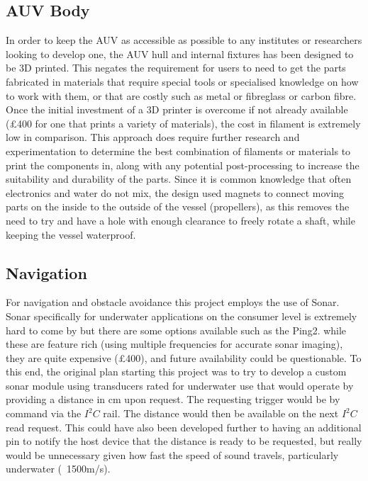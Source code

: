 \documentclass[11pt,a4paper,titlepage]{report}
\begin{document}
	\subsection*{AUV Body}
	In order to keep the AUV as accessible as possible to any institutes or researchers looking to develop one, the AUV hull and internal fixtures has been designed to be 3D printed. This negates the requirement for users to need to get the parts fabricated in materials that require special tools or specialised knowledge on how to work with them, or that are costly such as metal or fibreglass or carbon fibre. Once the initial investment of a 3D printer is overcome if not already available (\unit{\approx}£400 for one that prints a variety of materials), the cost in filament is extremely low in comparison. This approach does require further research and experimentation to determine the best combination of filaments or materials to print the components in, along with any potential post-processing to increase the suitability and durability of the parts.
	Since it is common knowledge that often electronics and water do not mix, the design used magnets to connect moving parts on the inside to the outside of the vessel (propellers), as this removes the need to try and have a hole with enough clearance to freely rotate a shaft, while keeping the vessel waterproof. 
	
	\subsection*{Navigation}
	For navigation and obstacle avoidance this project employs the use of Sonar. Sonar specifically for underwater applications on the consumer level is extremely hard to come by but there are some options available such as the Ping2\cite{PING2}. while these are feature rich (using multiple frequencies for accurate sonar imaging), they are quite expensive (\unit{\approx}£400), and future availability could be questionable. To this end, the original plan starting this project was to try to develop a custom sonar module using transducers rated for underwater use\cite{ALUMINIUM_TRANSDUCER} that would operate by providing a distance in \unit{\centi\metre} upon request. The requesting trigger would be by command via the $I^{2}C$ rail. The distance would then be available on the next $I^{2}C$ read request. This could have also been developed further to having an additional pin to notify the host device that the distance is ready to be requested, but really would be unnecessary given how fast the speed of sound travels, particularly underwater (~1500\unit{\metre}/\unit{\second}). 
	
\end{document}
